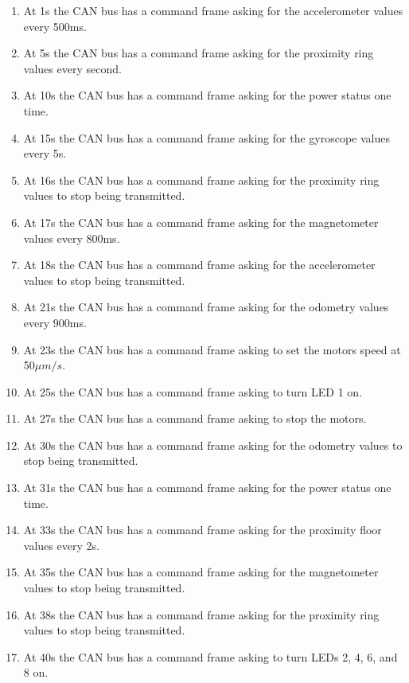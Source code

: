 \documentclass[12pt]{report}%
\begin{document}
\begin{enumerate}
\item At 1s the CAN bus has a command frame asking for the accelerometer values every 500ms.
\item At 5s the CAN bus has a command frame asking for the proximity ring values every second.
\item At 10s the CAN bus has a command frame asking for the power status one time.
\item At 15s the CAN bus has a command frame asking for the gyroscope values every 5s.
\item At 16s the CAN bus has a command frame asking for the proximity ring values to stop being transmitted.
\item At 17s the CAN bus has a command frame asking for the magnetometer values every 800ms.
\item At 18s the CAN bus has a command frame asking for the accelerometer values to stop being transmitted.
\item At 21s the CAN bus has a command frame asking for the odometry values every 900ms.
\item At 23s the CAN bus has a command frame asking to set the motors speed at 50$\mu m/s$.
\item At 25s the CAN bus has a command frame asking to turn LED 1 on.
\item At 27s the CAN bus has a command frame asking to stop the motors.
\item At 30s the CAN bus has a command frame asking for the odometry values to stop being transmitted.
\item At 31s the CAN bus has a command frame asking for the power status one time.
\item At 33s the CAN bus has a command frame asking for the proximity floor values every 2s.
\item At 35s the CAN bus has a command frame asking for the magnetometer values to stop being transmitted.
\item At 38s the CAN bus has a command frame asking for the proximity ring values to stop being transmitted.
\item At 40s the CAN bus has a command frame asking to turn LEDs 2, 4, 6, and 8 on.
\end{enumerate}
\end{document}
